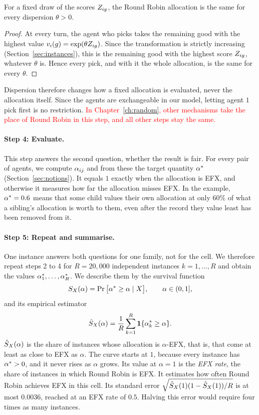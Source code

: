 \begin{lemma}\label{lem:thetainv}
For a fixed draw of the scores $Z_{ig}$, the Round Robin allocation is the same for every dispersion
$\theta>0$.
\end{lemma}

\begin{proof}
At every turn, the agent who picks takes the remaining good with the highest value
$v_i(g)=\exp(\theta Z_{ig})$. Since the transformation is strictly increasing
(Section~\ref{sec:instances}), this is the remaining good with the highest score $Z_{ig}$, whatever
$\theta$ is. Hence every pick, and with it the whole allocation, is the same for every $\theta$.
\end{proof}

Dispersion therefore changes how a fixed allocation is evaluated, never the allocation itself.
Since the agents are exchangeable in our model, letting agent $1$ pick first is no restriction.
\textcolor{red}{In Chapter~\ref{ch:random}, other mechanisms take the place of Round Robin in this
step, and all other steps stay the same.}

\paragraph{Step 4: Evaluate.}
This step answers the second question, whether the result is fair. For every pair of agents, we
compute $\alpha_{ij}$ and from these the target quantity $\alpha^{*}$ (Section~\ref{sec:notions}). It equals
$1$ exactly when the allocation is EFX, and otherwise it measures how far the allocation misses
EFX. In the example, $\alpha^{*}=0.6$ means that some child values their own allocation at only $60\%$
of what a sibling's allocation is worth to them, even after the record they value least has been
removed from it.

\paragraph{Step 5: Repeat and summarise.}
One instance answers both questions for one family, not for the cell. We therefore repeat steps 2
to 4 for $R=20{,}000$ independent instances $k=1,\dots,R$ and obtain the values
$\alpha^{*}_1,\dots,\alpha^{*}_R$. We describe them by the survival function
\[
  S_X(\alpha)=\Pr\big[\alpha^{*}\geq\alpha \mid X\big],\qquad \alpha\in(0,1],
\]
and its empirical estimator
\[
  \hat{S}_X(\alpha)=\frac{1}{R}\sum_{k=1}^{R}\mathbf{1}\{\alpha^{*}_k\geq\alpha\}.
\]
$\hat{S}_X(\alpha)$ is the share of instances whose allocation is $\alpha$-EFX, that is, that come
at least as close to EFX as $\alpha$. The curve starts at $1$, because every instance has
$\alpha^{*}>0$, and it never rises as $\alpha$ grows. Its value at $\alpha=1$ is the \textit{EFX
rate}, the share of instances in which Round Robin is EFX. It estimates how often Round Robin
achieves EFX in this cell. Its standard error $\sqrt{\hat{S}_X(1)(1-\hat{S}_X(1))/R}$ is at most
$0.0036$, reached at an EFX rate of $0.5$. Halving this error would require four times as many
instances.

